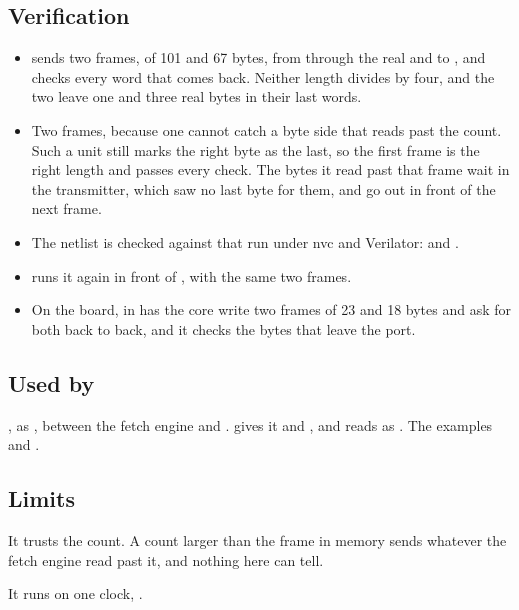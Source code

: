\subsection*{Verification}

\begin{itemize}
\item {} sends two frames, of 101 and 67 bytes, from
 through the real  and  to
, and checks every word that comes back. Neither length
divides by four, and the two leave one and three real bytes in their
last words.
\item Two frames, because one cannot catch a byte side that reads past
the count. Such a unit still marks the right byte as the last, so the
first frame is the right length and passes every check. The bytes it
read past that frame wait in the transmitter, which saw no last byte
for them, and go out in front of the next frame.
\item The netlist is checked against that run under nvc and
Verilator: 
and .
\item {} runs it again in front of ,
with the same two frames.
\item On the board,
in  has the core write two frames of
23 and 18 bytes and ask for both back to back, and it checks the bytes
that leave the port.
\end{itemize}

\subsection*{Used by}

, as , between the fetch engine 
and .  gives it  and
, and reads  as . The examples
 and .

\subsection*{Limits}

It trusts the count. A count larger than the frame in memory sends
whatever the fetch engine read past it, and nothing here can tell.

It runs on one clock, .
